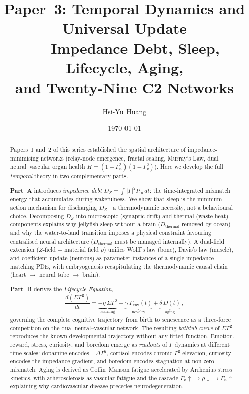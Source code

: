 \documentclass[aps,pre,twocolumn,superscriptaddress,floatfix]{revtex4-2}
\begin{document}
\title{Paper~3: Temporal Dynamics and Universal Update\\
--- Impedance Debt, Sleep, Lifecycle, Aging,\\
and Twenty-Nine C2 Networks}

\author{Hsi-Yu Huang}

\date{\today}

\begin{abstract}
Papers~1 and~2 of this series established the spatial
architecture of impedance-minimising networks
(relay-node emergence, fractal scaling, Murray's Law,
dual neural--vascular organ health
$H = (1-\Gamma_n^2)(1-\Gamma_v^2)$).
Here we develop the full \emph{temporal} theory in two
complementary parts.

\textbf{Part~A} introduces \emph{impedance debt}
$D_Z = \int |\Gamma|^2 P_{\mathrm{in}}\,dt$:
the time-integrated mismatch energy that accumulates
during wakefulness.
We show that sleep is the minimum-action mechanism
for discharging $D_Z$---a thermodynamic necessity,
not a behavioural choice.
Decomposing $D_Z$ into microscopic (synaptic drift)
and thermal (waste heat) components explains why
jellyfish sleep without a brain
($D_{\mathrm{thermal}}$ removed by ocean)
and why the water-to-land transition imposes a physical
constraint favouring centralised neural architecture
($D_{\mathrm{thermal}}$ must be managed internally).
A dual-field extension ($Z$-field + material field $\rho$)
unifies Wolff's law (bone), Davis's law (muscle),
and coefficient update (neurons) as parameter
instances of a single impedance-matching PDE,
with embryogenesis recapitulating the thermodynamic
causal chain (heart $\to$ neural tube $\to$ brain).

\textbf{Part~B} derives the \emph{Lifecycle Equation},
\begin{equation*}
  \frac{d(\Sigma\Gamma^2)}{dt}
    = \underbrace{-\eta\,\Sigma\Gamma^2}_{\text{learning}}
    + \underbrace{\gamma\,\Gamma_{\mathrm{env}}(t)}_{\text{novelty}}
    + \underbrace{\delta\,D(t)}_{\text{aging}}\,,
\end{equation*}
governing the complete cognitive trajectory from birth to
senescence as a three-force competition on the dual
neural--vascular network.
The resulting \emph{bathtub curve} of $\Sigma\Gamma^2$
reproduces the known developmental trajectory without
any fitted function.
Emotion, reward, stress, curiosity, and boredom emerge as
\emph{readouts} of $\Gamma$ dynamics at different time scales:
dopamine encodes $-\Delta\Gamma^2$, cortisol encodes chronic
$\Gamma^2$ elevation, curiosity encodes the impedance gradient,
and boredom encodes stagnation at non-zero mismatch.
Aging is derived as Coffin--Manson fatigue accelerated by
Arrhenius stress kinetics, with
atherosclerosis as vascular fatigue and the cascade
$\Gamma_v\!\uparrow \to \rho\!\downarrow \to \Gamma_n\!\uparrow$
explaining why cardiovascular disease precedes
neurodegeneration.


\end{abstract}
\end{document}
